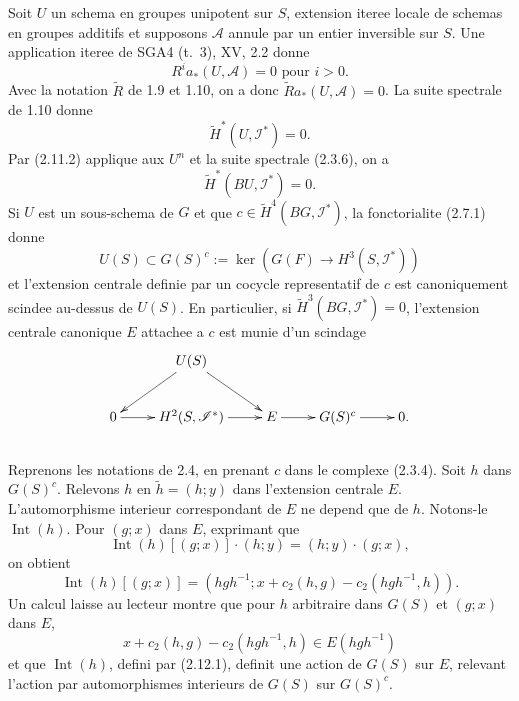 \documentclass[11pt,a4paper]{article}
\theoremstyle{plain}
\theoremstyle{definition}
\DeclareMathOperator{\Int}{Int}
\begin{document}
Soit $U$ un schema en groupes unipotent sur $S$, extension iteree locale de schemas en groupes additifs et supposons $\mathscr{A}$ annule par un entier inversible sur $S$. Une application iteree de SGA4 (t.~3), XV, 2.2 donne
\begin{equation}\label{2.11.1}
R^i a_* (U, \mathscr{A}) = 0 \text{ pour } i > 0.
\end{equation}
Avec la notation $\widetilde{R}$ de 1.9 et 1.10, on a donc $\widetilde{R} a_* (U, \mathscr{A}) = 0$. La suite spectrale de 1.10 donne
\begin{equation}\label{2.11.2}
\widetilde{H}^*(U, \mathscr{I}^*) = 0.
\end{equation}
Par (2.11.2) applique aux $U^n$ et la suite spectrale (2.3.6), on a
\begin{equation}\label{2.11.3}
\widetilde{H}^*(BU, \mathscr{I}^*) = 0.
\end{equation}
Si $U$ est un sous-schema de $G$ et que $c \in \widetilde{H}^4(BG, \mathscr{I}^*)$, la fonctorialite (2.7.1) donne
\begin{equation}\label{2.11.4}
U(S) \subset G(S)^c := \ker(G(F) \to H^3(S, \mathscr{I}^*))
\end{equation}
et l'extension centrale definie par un cocycle representatif de $c$ est canoniquement scindee au-dessus de $U(S)$. En particulier, si $\widetilde{H}^3(BG, \mathscr{I}^*) = 0$, l'extension centrale canonique $E$ attachee a $c$ est munie d'un scindage
\[
\xymatrix{
& U(S) \ar[dl] \ar[dr] & \\
0 \ar[r] & H^2(S, \mathscr{I}^*) \ar[r] & E \ar[r] & G(S)^c \ar[r] & 0.
}
\]

\subsection{}\label{2.12}

Reprenons les notations de 2.4, en prenant $c$ dans le complexe (2.3.4). Soit $h$ dans $G(S)^c$. Relevons $h$ en $\tilde{h} = (h; y)$ dans l'extension centrale $E$. L'automorphisme interieur correspondant de $E$ ne depend que de $h$. Notons-le $\Int(h)$. Pour $(g; x)$ dans $E$, exprimant que
\[
\Int(h)[(g; x)] \cdot (h; y) = (h; y) \cdot (g; x),
\]
on obtient
\begin{equation}\label{2.12.1}
\Int(h)[(g; x)] = (hgh^{-1}; x + c_2(h, g) - c_2(hgh^{-1}, h)).
\end{equation}
Un calcul laisse au lecteur montre que pour $h$ arbitraire dans $G(S)$ et $(g; x)$ dans $E$,
\[
x + c_2(h, g) - c_2(hgh^{-1}, h) \in E(hgh^{-1})
\]
et que $\Int(h)$, defini par (2.12.1), definit une action de $G(S)$ sur $E$, relevant l'action par automorphismes interieurs de $G(S)$ sur $G(S)^c$.
\end{document}
